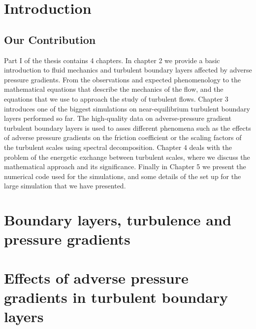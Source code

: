 \graphicspath{{imgs/}}

\chapter{Introduction}
%


\section{Our Contribution}
%
\thesisstructure Part I of the thesis contains 4 chapters. 
In chapter 2 we provide a basic introduction to fluid mechanics and turbulent boundary layers affected by adverse pressure gradients.
From the observations and expected phenomenology to the mathematical equations that describe the mechanics of the flow, and the equations that we use to approach the study of turbulent flows.
Chapter 3 introduces one of the biggest simulations on near-equilibrium turbulent boundary layers performed so far. The high-quality data on adverse-pressure gradient turbulent boundary layers is used to asses different phenomena such as the effects of adverse pressure gradients on the friction coefficient or the scaling factors of the turbulent scales using spectral decomposition.
Chapter 4 deals with the problem of the energetic exchange between turbulent scales, where we discuss the mathematical approach and its significance.
Finally in Chapter 5 we present the numerical code used for the simulations, and some details of the set up for the large simulation that we have presented.

\chapter{Boundary layers, turbulence and pressure gradients}
%

\chapter{Effects of adverse pressure gradients in turbulent boundary layers}
%

%
